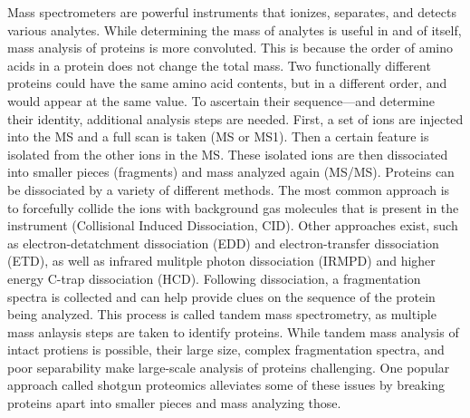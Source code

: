 Mass spectrometers are powerful instruments that ionizes, separates, and detects various analytes. While determining the mass of analytes is useful in and of itself, mass analysis of proteins is more convoluted. This is because the order of amino acids in a protein does not change the total mass. Two functionally different proteins could have the same amino acid contents, but in a different order, and would appear at the same \mz{} value. To ascertain their sequence---and determine their identity, additional analysis steps are needed. First, a set of ions are injected into the MS and a full scan is taken (MS or MS1). Then a certain \mz{} feature is isolated from the other ions in the MS. These isolated ions are then dissociated into smaller pieces (fragments) and mass analyzed again (MS/MS). Proteins can be dissociated by a variety of different methods. The most common approach is to forcefully collide the ions with background gas molecules that is present in the instrument (Collisional Induced Dissociation, CID)\cite{cid}. Other approaches exist, such as electron-detatchment dissociation (EDD)\cite{edd} and electron-transfer dissociation (ETD)\cite{etd}, as well as infrared mulitple photon dissociation (IRMPD)\cite{irmpd} and higher energy C-trap dissociation (HCD)\cite{hcd}. Following dissociation, a fragmentation spectra is collected and can help provide clues on the sequence of the protein being analyzed. This process is called tandem mass spectrometry, as multiple mass anlaysis steps are taken to identify proteins. While tandem mass analysis of intact protiens is possible, their large size, complex fragmentation spectra, and poor separability make large-scale analysis of proteins challenging. One popular approach called shotgun proteomics alleviates some of these issues by breaking proteins apart into smaller pieces and mass analyzing those.

